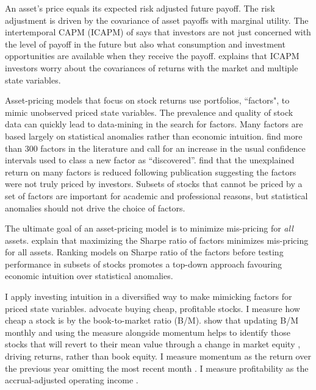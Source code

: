 

An asset’s price equals its expected risk adjusted future payoff. The risk
adjustment is driven by the covariance of asset payoffs with marginal utility.
The intertemporal CAPM (ICAPM) of \textcite{merton1973intertemporal} says that
investors are not just concerned with the level of payoff in the future but
also what consumption and investment opportunities are available when they
receive the payoff. \textcite{fama1996multifactor} explains that ICAPM
investors worry about the covariances of returns with the market and multiple
state variables.

Asset-pricing models that focus on stock returns use portfolios, ``factors", to
mimic unobserved priced state variables. The prevalence and
quality of stock data can quickly lead to data-mining in the search for
factors. Many factors are based largely on statistical anomalies rather than
economic intuition. \textcite{harvey2016and} find more than 300 factors in the
literature and call for an increase in the usual confidence intervals used to
class a new factor as ``discovered”. \textcite{mclean2016does} find that the
unexplained return on many factors is reduced following publication suggesting
the factors were not truly priced by investors.
Subsets of stocks that cannot
be priced by a set of factors are important for academic and professional
reasons, but statistical anomalies should not drive the choice of factors.

The ultimate goal of an asset-pricing model is to minimize mis-pricing for
\emph{all} assets. \textcite{barillas2016alpha} explain that maximizing the
Sharpe ratio of factors minimizes mis-pricing for all assets. Ranking models on
Sharpe ratio of the factors before testing performance in subsets of stocks
promotes a top-down approach favouring economic intuition over statistical
anomalies.

I apply investing intuition in a diversified way to make mimicking factors for
priced state variables. \textcite{graham1934security} advocate buying cheap,
profitable stocks. I measure how cheap a stock is by the book-to-market ratio
(B/M). \textcite{kok2017facts, asness2013devil} show that updating B/M monthly
and using the measure alongside momentum helps to identify those stocks that
will revert to their mean value through a change in market equity
, driving returns, rather than book
equity. I measure momentum as the return over the previous year omitting the
most recent month \parencite{fama2016dissecting}. I measure profitability as
the accrual-adjusted operating income \parencite{ball2016accruals}.

